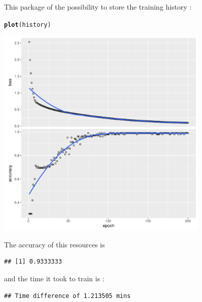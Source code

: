 \documentclass[letter]{article}\usepackage[]{graphicx}\usepackage[]{color}
\makeatletter
\newcommand{\hlstd}[1]{\textcolor[rgb]{0.345,0.345,0.345}{#1}}%
\newcommand{\hlkwd}[1]{\textcolor[rgb]{0.737,0.353,0.396}{\textbf{#1}}}%
\newenvironment{kframe}{%
 \def\at@end@of@kframe{}%
 \ifinner\ifhmode%
  \def\at@end@of@kframe{\end{minipage}}%
  \begin{minipage}{\columnwidth}%
 \fi\fi%
 \def\FrameCommand##1{\hskip\@totalleftmargin \hskip-\fboxsep
 \colorbox{shadecolor}{##1}\hskip-\fboxsep
     \hskip-\linewidth \hskip-\@totalleftmargin \hskip\columnwidth}%
 \MakeFramed {\advance\hsize-\width
   \@totalleftmargin\z@ \linewidth\hsize
   \@setminipage}}%
 {\par\unskip\endMakeFramed%
 \at@end@of@kframe}
\newenvironment{knitrout}{}{} %
\makeatother
\begin{document}
This package of the possibility to store the training history :
\begin{knitrout}
\color{fgcolor}\begin{kframe}
\begin{alltt}
\hlkwd{plot}\hlstd{(history)}
\end{alltt}
\end{kframe}
\includegraphics[width=4in]{figure/unnamed-chunk-25-1} 

\end{knitrout}

The accuracy of this resources is
\begin{knitrout}
\color{fgcolor}\begin{kframe}
\begin{verbatim}
## [1] 0.9333333
\end{verbatim}
\end{kframe}
\end{knitrout}
and the time it took to train is :
\begin{knitrout}
\color{fgcolor}\begin{kframe}
\begin{verbatim}
## Time difference of 1.213505 mins
\end{verbatim}
\end{kframe}
\end{knitrout}
\end{document}
